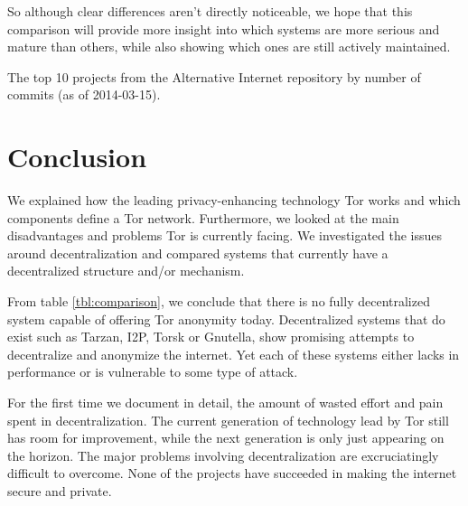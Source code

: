 \documentclass{article}
\begin{document}
	So although clear differences aren't directly noticeable, we hope that this comparison will provide more insight into which systems are more serious and mature than others, while also showing which ones are still actively maintained.
		
	\begin{table}
		\centering
		
		\caption{The top 10 projects from the Alternative Internet repository by number of commits (as of 2014-03-15).}
		\label{tbl:altinternet}
	\end{table}
	
\section{Conclusion}
	\label{sec:conclusion}
		
	We explained how the leading privacy-enhancing technology Tor works and which components define a Tor network. Furthermore, we looked at the main disadvantages and problems Tor is currently facing. We investigated the issues around decentralization and compared systems that currently have a decentralized structure and/or mechanism.
		
	From table \ref{tbl:comparison}, we conclude that there is no fully decentralized system capable of offering Tor anonymity today. Decentralized systems that do exist such as Tarzan, I2P, Torsk or Gnutella, show promising attempts to decentralize and anonymize the internet. Yet each of these systems either lacks in performance or is vulnerable to some type of attack.
		
	For the first time we document in detail, the amount of wasted effort and pain spent in decentralization. The current generation of technology lead by Tor still has room for improvement, while the next generation is only just appearing on the horizon. The major problems involving decentralization are excruciatingly difficult to overcome. None of the projects have succeeded in making the internet secure and private.



\end{document}
